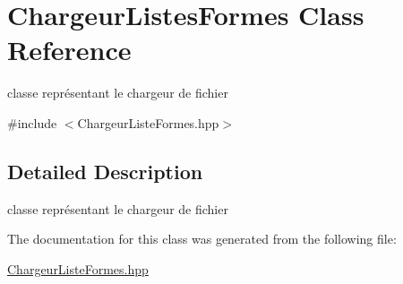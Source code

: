 \hypertarget{class_chargeur_listes_formes}{}\section{Chargeur\+Listes\+Formes Class Reference}
\label{class_chargeur_listes_formes}


classe représentant le chargeur de fichier  




{\ttfamily \#include $<$Chargeur\+Liste\+Formes.\+hpp$>$}



\subsection{Detailed Description}
classe représentant le chargeur de fichier 

The documentation for this class was generated from the following file\+:\begin{DoxyCompactItemize}
\item 
\mbox{\hyperlink{_chargeur_liste_formes_8hpp}{Chargeur\+Liste\+Formes.\+hpp}}\end{DoxyCompactItemize}
